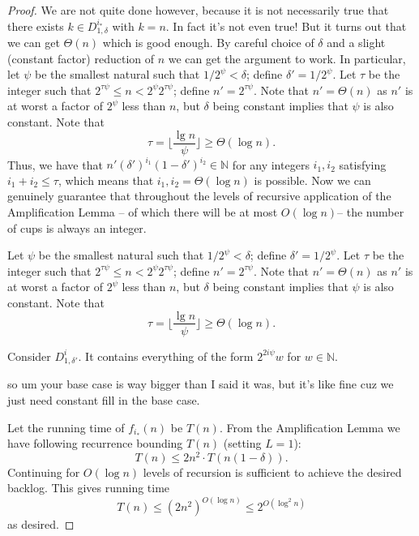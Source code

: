 \documentclass[twocolumn]{article}[10pt]
\begin{document}
\begin{proof}
  We are not quite done however, because it is not necessarily
  true that there exists $k \in D^{i_*}_{1,\delta}$ with $k = n.$
  In fact it's not even true! But it turns out that we can get
  $\Theta(n)$ which is good enough. By
  careful choice of $\delta$ and a slight (constant factor) reduction of $n$ we can get the
  argument to work. In particular, let $\psi$ be the smallest natural such that
  $1/2^\psi < \delta$; define $\delta' = 1/2^\psi$. Let $\tau$ be the integer
  such that $2^{\tau \psi} \le n < 2^\psi 2^{\tau \psi}$; define $n' =
  2^{\tau\psi}$. Note that $n' = \Theta(n)$ as $n'$ is at worst a factor of
  $2^\psi$ less than $n$, but $\delta$ being constant implies that $\psi$ is
  also constant. Note that $$\tau = \Big\lfloor \frac{\lg
  n}{\psi} \Big\rfloor \ge \Theta(\log n).$$
  Thus, we have that $n'(\delta')^{i_1}(1-\delta')^{i_2} \in \mathbb{N}$ for any
  integers $i_1,i_2$ satisfying $i_1+i_2 \le \tau$, which means
  that $i_1,i_2= \Theta(\log n)$ is possible.
  Now we can genuinely guarantee that throughout the levels of recursive application of
  the Amplification Lemma -- of which there will be at most $O(\log n)$-- the
  number of cups is always an integer. 

  {\color{red} %
  Let $\psi$ be the smallest natural such that
  $1/2^\psi < \delta$; define $\delta' = 1/2^\psi$. Let $\tau$ be the integer
  such that $2^{\tau \psi} \le n < 2^\psi 2^{\tau \psi}$; define $n' =
  2^{\tau\psi}$. Note that $n' = \Theta(n)$ as $n'$ is at worst a factor of
  $2^\psi$ less than $n$, but $\delta$ being constant implies that $\psi$ is
  also constant. Note that $$\tau = \Big\lfloor \frac{\lg
  n}{\psi} \Big\rfloor \ge \Theta(\log n).$$

  Consider $D^i_{1, \delta'}$. It contains everything of the form
  $2^{2i \psi} w$ for $w\in\mathbb{N}$.

  so um your base case is way bigger than I said it was, 
  but it's like fine cuz we just need constant fill in the base case.
  }

  Let the running time of $f_{i_*}(n)$ be $T(n)$. From the Amplification Lemma we have 
  following recurrence bounding $T(n)$ (setting $L=1$):
  $$T(n) \le 2n^2 \cdot T(n(1-\delta)).$$
  Continuing for $O(\log n)$ levels of recursion is sufficient to
  achieve the desired backlog. This gives running time
  $$T(n) \le (2n^2)^{O(\log n)} \le 2^{O(\log^2 n)}$$
  as desired.

\end{proof}
\end{document}

